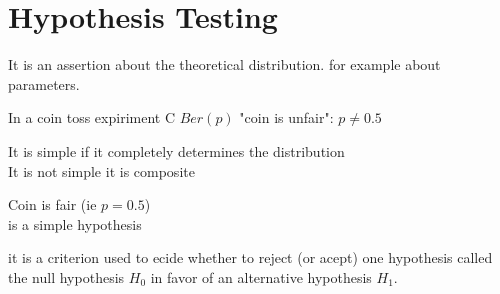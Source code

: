 \documentclass[answers,12pt,addpoints]{exam}
\begin{document}
\section*{Hypothesis Testing}
\begin{definition}
    It is an assertion about the theoretical distribution. for example about parameters.
    \begin{example}
        In a coin toss expiriment C $Ber(p)$ "coin is unfair": $p \neq 0.5$\\
    \end{example}
    It is simple if it completely determines the distribution\\
    It is not simple it is composite
\end{definition}
\begin{example}
    Coin is fair (ie $p = 0.5$)\\
    is a simple hypothesis
\end{example}
\begin{definition}
    it is a criterion used to ecide whether to reject (or acept) one hypothesis called the null hypothesis $H_0$ in favor of an alternative hypothesis $H_1$.
\end{definition}
\end{document}
